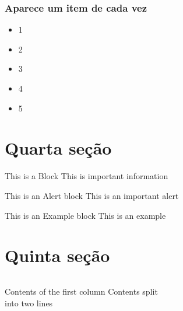 \documentclass{beamer}
\begin{document}
  \begin{frame}
    \frametitle{Aparece um item de cada vez}
    \begin{itemize}
	\item<+-> 1
	\item<+-> 2
	\item<+-> 3
	\item<+-> 4
	\item<+-> 5
    \end{itemize}
  \end{frame}

  \section{Quarta seção}

  \begin{frame}

    \begin{block}{This is a Block}
	This is important information
    \end{block}

    \begin{alertblock}{This is an Alert block}
    This is an important alert
    \end{alertblock}

    \begin{exampleblock}{This is an Example block}
    This is an example
    \end{exampleblock}

  \end{frame}

    \section{Quinta seção}

  \begin{frame}
      \begin{columns}[c] %
      Contents of the first column
      Contents split \\ into two lines
      \end{columns}
  \end{frame}
\end{document}
